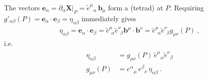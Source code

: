 \documentclass[letterpaper,10pt,english]{jupyterBook}
\begin{document}
The vectors \(\mathbf e_\alpha=\partial_\alpha\mathbf X|_P=\tilde e^\mu{}_\alpha\,\mathbf b_\mu\) form a  (tetrad) at \(P\). Requiring \(g'_{\alpha\beta}(P) = \mathbf{e}_{\alpha} \cdot \mathbf{e}_{\beta} = \eta_{\alpha\beta}\) immediately gives
\begin{equation*}
\begin{split}
\eta_{\alpha \beta} = \mathbf{e}_{\alpha} \cdot \mathbf{e}_{\beta} = \widetilde{e}^{\mu}_{\ \ \alpha} \widetilde{e}^{\nu}_{\ \ \beta} \mathbf{b}^{\mu} \cdot \mathbf{b}^{\nu} = \widetilde{e}^{\mu}_{\ \ \alpha} \widetilde{e}^{\nu}_{\ \ \beta} g_{\mu \nu}(P) \ , \end{split}
\end{equation*}
\sphinxAtStartPar
i.e.
\begin{equation}\label{equation:ch/relativity-general/local-inertial-reference-frame-and-equivalence-principle:eq-tetrad}
\begin{split}\begin{aligned}
  \eta_{\alpha \beta} & = g_{\mu\nu}(P)\,\tilde e^\mu{}_\alpha\tilde e^\nu{}_\beta \\
  g_{\mu\nu}(P) & = e^\alpha{}_\mu\,e^\beta{}_\nu\,\eta_{\alpha\beta} \ .
\end{aligned}\end{split}
\end{equation}
\end{document}
